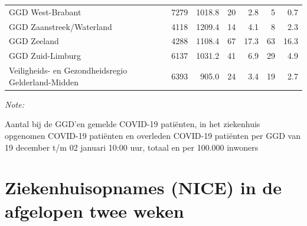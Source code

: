 \documentclass[
  english,
  man,floatsintext]{apa6}
\begin{document}
\begin{table}
\begin{threeparttable}
\begin{tabular}{lrrrrrr}
GGD West-Brabant & 7279 & 1018.8 & 20 & 2.8 & 5 & 0.7\\
GGD Zaanstreek/Waterland & 4118 & 1209.4 & 14 & 4.1 & 8 & 2.3\\
GGD Zeeland & 4288 & 1108.4 & 67 & 17.3 & 63 & 16.3\\
GGD Zuid-Limburg & 6137 & 1031.2 & 41 & 6.9 & 29 & 4.9\\
Veiligheids- en Gezondheidsregio Gelderland-Midden & 6393 & 905.0 & 24 & 3.4 & 19 & 2.7\\
\bottomrule
\end{tabular}
\begin{tablenotes}
\item \textit{Note: } 
\item Aantal bij de GGD’en gemelde COVID-19 patiënten, in het ziekenhuis opgenomen COVID-19 patiënten en overleden COVID-19 patiënten per GGD van 19 december t/m 02 januari 10:00 uur, totaal en per 100.000 inwoners
\end{tablenotes}
\end{threeparttable}
\endgroup{}
\end{table}

\newpage

\hypertarget{ziekenhuisopnames-nice-in-de-afgelopen-twee-weken}{%
\section{Ziekenhuisopnames (NICE) in de afgelopen twee weken}\label{ziekenhuisopnames-nice-in-de-afgelopen-twee-weken}}
\end{document}
